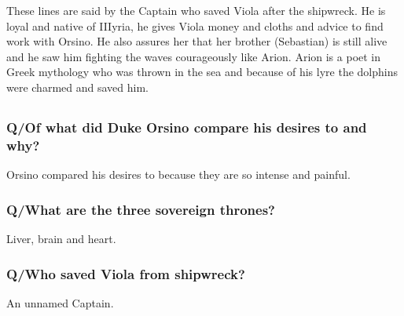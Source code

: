 \documentclass[12pt, a4paper]{article}
\begin{document}
These lines are said by the Captain who saved Viola after the shipwreck.
He is loyal and native of IIIyria, he gives Viola money and cloths and
advice to find work with Orsino. He also assures her that her brother 
(Sebastian) is still alive and he saw 
him fighting the waves courageously like Arion. Arion is a poet in Greek
mythology who was thrown in the sea and because of his lyre the dolphins
were charmed and saved him.

\subsection*{}\bigbreak

\subsubsection*{Q/Of what did Duke Orsino compare his desires to and why?}
Orsino compared his desires to  because they are so intense 
and painful.

\subsubsection*{Q/What are the three sovereign thrones?}

Liver, brain and heart.

\subsubsection*{Q/Who saved Viola from shipwreck?}

An unnamed Captain.
\end{document}
